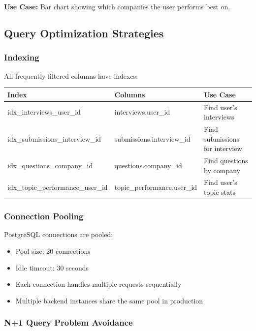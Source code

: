 \documentclass[12pt,a4paper,oneside]{article}
\begin{document}
\textbf{Use Case:} Bar chart showing which companies the user performs best on.

\subsection{Query Optimization Strategies}

\subsubsection{Indexing}

All frequently filtered columns have indexes:

\begin{table}[H]
\centering
\small
\begin{tabular}{|p{3cm}|p{4cm}|p{7cm}|}
\hline
\textbf{Index} & \textbf{Columns} & \textbf{Use Case} \\
\hline
idx\_interviews\_user\_id & interviews.user\_id & Find user's interviews \\
\hline
idx\_submissions\_interview\_id & submissions.interview\_id & Find submissions for interview \\
\hline
idx\_questions\_company\_id & questions.company\_id & Find questions by company \\
\hline
idx\_topic\_performance\_user\_id & topic\_performance.user\_id & Find user's topic stats \\
\hline
\end{tabular}
\end{table}

\subsubsection{Connection Pooling}

PostgreSQL connections are pooled:

\begin{itemize}
    \item Pool size: 20 connections
    \item Idle timeout: 30 seconds
    \item Each connection handles multiple requests sequentially
    \item Multiple backend instances share the same pool in production
\end{itemize}

\subsubsection{N+1 Query Problem Avoidance}
\end{document}
